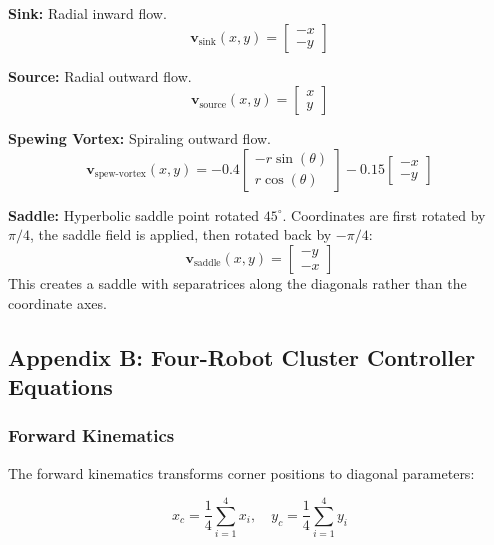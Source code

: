 \documentclass[lettersize,journal]{IEEEtran}
\begin{document}
\textbf{Sink:} Radial inward flow.
\begin{equation}
\mathbf{v}_{\text{sink}}(x, y) = \begin{bmatrix} -x \\ -y \end{bmatrix}
\end{equation}

\textbf{Source:} Radial outward flow.
\begin{equation}
\mathbf{v}_{\text{source}}(x, y) = \begin{bmatrix} x \\ y \end{bmatrix}
\end{equation}

\textbf{Spewing Vortex:} Spiraling outward flow.
\begin{equation}
\mathbf{v}_{\text{spew-vortex}}(x, y) = -0.4 \begin{bmatrix} -r \sin(\theta) \\ r \cos(\theta) \end{bmatrix} - 0.15 \begin{bmatrix} -x \\ -y \end{bmatrix}
\end{equation}

\textbf{Saddle:} Hyperbolic saddle point rotated $45^\circ$. Coordinates are first rotated by $\pi/4$, the saddle field is applied, then rotated back by $-\pi/4$:
\begin{equation}
\mathbf{v}_{\text{saddle}}(x, y) = \begin{bmatrix} -y \\ -x \end{bmatrix}
\end{equation}
This creates a saddle with separatrices along the diagonals rather than the coordinate axes.

\subsection{Appendix B: Four-Robot Cluster Controller Equations}

\subsubsection{Forward Kinematics}

The forward kinematics transforms corner positions to diagonal parameters:

\begin{equation}
x_c = \frac{1}{4}\sum_{i=1}^{4} x_i, \quad y_c = \frac{1}{4}\sum_{i=1}^{4} y_i
\end{equation}
\end{document}
